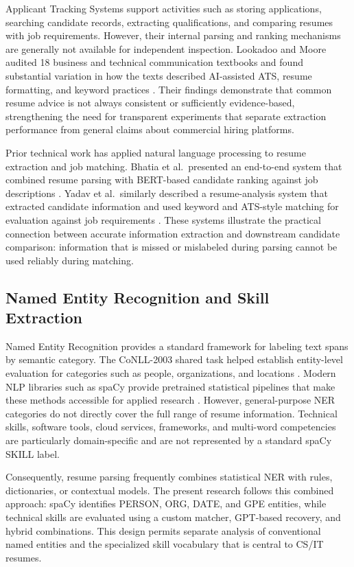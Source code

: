 \documentclass[conference]{IEEEtran}
\begin{document}
Applicant Tracking Systems support activities such as storing applications, searching candidate records, extracting qualifications, and comparing resumes with job requirements. However, their internal parsing and ranking mechanisms are generally not available for independent inspection. Lookadoo and Moore audited 18 business and technical communication textbooks and found substantial variation in how the texts described AI-assisted ATS, resume formatting, and keyword practices \cite{lookadoo2025}. Their findings demonstrate that common resume advice is not always consistent or sufficiently evidence-based, strengthening the need for transparent experiments that separate extraction performance from general claims about commercial hiring platforms.

Prior technical work has applied natural language processing to resume extraction and job matching. Bhatia et al.\ presented an end-to-end system that combined resume parsing with BERT-based candidate ranking against job descriptions \cite{bhatia2019resume}. Yadav et al.\ similarly described a resume-analysis system that extracted candidate information and used keyword and ATS-style matching for evaluation against job requirements \cite{yadav2025}. These systems illustrate the practical connection between accurate information extraction and downstream candidate comparison: information that is missed or mislabeled during parsing cannot be used reliably during matching.

\subsection{Named Entity Recognition and Skill Extraction}

Named Entity Recognition provides a standard framework for labeling text spans by semantic category. The CoNLL-2003 shared task helped establish entity-level evaluation for categories such as people, organizations, and locations \cite{conll2003}. Modern NLP libraries such as spaCy provide pretrained statistical pipelines that make these methods accessible for applied research \cite{spacy2020}. However, general-purpose NER categories do not directly cover the full range of resume information. Technical skills, software tools, cloud services, frameworks, and multi-word competencies are particularly domain-specific and are not represented by a standard spaCy SKILL label.

Consequently, resume parsing frequently combines statistical NER with rules, dictionaries, or contextual models. The present research follows this combined approach: spaCy identifies PERSON, ORG, DATE, and GPE entities, while technical skills are evaluated using a custom matcher, GPT-based recovery, and hybrid combinations. This design permits separate analysis of conventional named entities and the specialized skill vocabulary that is central to CS/IT resumes.
\end{document}
